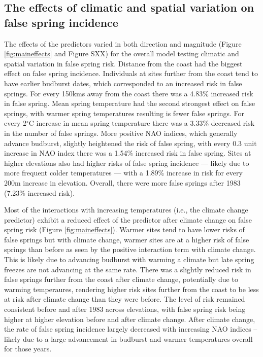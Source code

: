 \documentclass{article}\usepackage[]{graphicx}\usepackage[]{color}
\begin{document}
\subsection*{The effects of climatic and spatial variation on false spring incidence}
The effects of the predictors varied in both direction and magnitude (Figure \ref{fig:maineffects} and Figure SXX) for the overall model testing climatic and spatial variation in false spring risk. Distance from the coast had the biggest effect on false spring incidence. Individuals at sites further from the coast tend to have earlier budburst dates, which corresponded to an increased risk in false springs. For every 150kms away from the coast there was a 4.83\% increased risk in false spring. Mean spring temperature had the second strongest effect on false springs, with warmer spring temperatures resulting is fewer false springs. For every 2$^{\circ}$C increase in mean spring temperature there was a 3.33\% decreased risk in the number of false springs. More positive NAO indices, which generally advance budburst, slightly heightened the risk of false spring, with every 0.3 unit increase in NAO index there was a 1.54\% increased risk in false spring. Sites at higher elevations also had higher risks of false spring incidence --- likely due to more frequent colder temperatures --- with a 1.89\% increase in risk for every 200m increase in elevation. Overall, there were more false springs after 1983 (7.23\% increased risk). 

Most of the interactions with increasing temperatures (i.e., the climate change predictor) exhibit a reduced effect of the predictor after climate change on false spring risk (Figure \ref{fig:maineffects}). Warmer sites tend to have lower risks of false springs but with climate change, warmer sites are at a higher risk of false springs than before as seen by the positive interaction term with climate change. This is likely due to advancing budburst with warming a climate but late spring freezes are not advancing at the same rate. There was a slightly reduced risk in false springs further from the coast after climate change, potentially due to warming temperaures, rendering higher risk sites further from the coast to be less at risk after climate change than they were before. The level of risk remained consistent before and after 1983 across elevations, with false spring risk being higher at higher elevation before and after climate change. After climate change, the rate of false spring incidence largely decreased with increasing NAO indices -- likely due to a large advancement in budburst and warmer temperatures overall for those years. 
\end{document}
